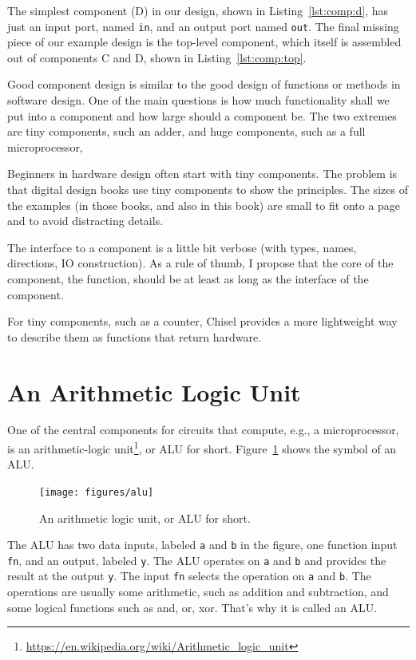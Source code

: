 \documentclass[%
    10pt,
    headinclude, footexclude,
    openright, %
    notitlepage,
    cleardoubleempty,
    headsepline,
    pointlessnumbers,
    bibtotoc, idxtotoc,
    ]{scrbook}
\newcommand{\code}[1]{{\lstinline[basicstyle=\small\ttfamily]{#1}}}
\newcommand{\myref}[2]{\href{#1}{#2}}
\renewcommand{\myref}[2]{{#2}{\footnote{\url{#1}}}}
\begin{document}

The simplest component (D) in our design, shown in Listing~\ref{lst:comp:d},
has just an input port, named \code{in}, and
an output port named \code{out}.
The final missing piece of our example design is the top-level component, which itself
is assembled out of components C and D, shown in Listing~\ref{lst:comp:top}.


Good component design is similar to the good design of functions or methods in
software design. One of the main questions is how much functionality shall we put into
a component and how large should a component be. The two extremes are tiny
components, such an adder, and huge components, such as a full microprocessor,

Beginners in hardware design often start with tiny components.
The problem is that digital design books use tiny components to show the principles.
The sizes of the examples (in those books, and also in this book) are small
to fit onto a page and to avoid distracting details.

The interface to a component is a little bit verbose (with types, names, directions,
IO construction). As a rule of thumb, I propose that the core of the component,
the function, should be at least as long as the interface of the component.

For tiny components, such as a counter, Chisel provides a more lightweight
way to describe them as functions that return hardware.


\section{An Arithmetic Logic Unit}

One of the central components for circuits that compute, e.g., a microprocessor, is an
\myref{https://en.wikipedia.org/wiki/Arithmetic_logic_unit}{arithmetic-logic unit},
or ALU for short. Figure~\ref{fig:alu} shows the symbol of an ALU.


\begin{figure}
  \centering
  \texttt{[image: figures/alu]}
  \caption{An arithmetic logic unit, or ALU for short.}
  \label{fig:alu}
\end{figure}

The ALU has two data inputs, labeled \code{a} and \code{b} in the figure, one function input \code{fn},
and an output, labeled \code{y}. The ALU operates on \code{a} and \code{b} and provides the result
at the output \code{y}. The input \code{fn} selects the operation on \code{a} and \code{b}.
The operations are usually some arithmetic, such as addition and subtraction, and some logical
functions such as and, or, xor. That's why it is called an ALU.
\end{document}
